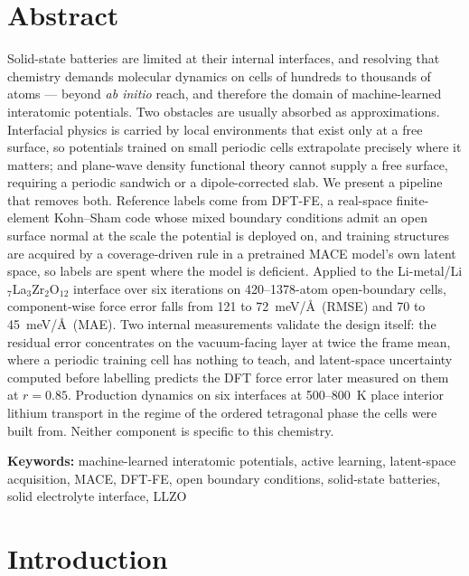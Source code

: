 \documentclass[11pt]{article}
\begin{document}
\section*{Abstract}
Solid-state batteries are limited at their internal interfaces, and resolving
that chemistry demands molecular dynamics on cells of hundreds to thousands of
atoms --- beyond \emph{ab initio} reach, and therefore the domain of
machine-learned interatomic potentials. Two obstacles are usually
absorbed as approximations. Interfacial physics is
carried by local environments that exist only at a free surface, so potentials
trained on small periodic cells extrapolate precisely where it matters; and
plane-wave density functional theory cannot supply a free surface,
requiring a periodic sandwich or a dipole-corrected slab. We present a pipeline
that removes both. Reference labels come from DFT-FE, a real-space
finite-element Kohn--Sham code whose mixed boundary conditions admit an
open surface normal at the scale the potential is deployed on, and
training structures are acquired by a coverage-driven rule in a pretrained MACE
model's own latent space, so labels are spent where the model is deficient. Applied to the Li-metal/Li$_7$La$_3$Zr$_2$O$_{12}$ interface over
six iterations on 420--1378-atom open-boundary cells, component-wise force
error falls from 121 to 72~meV/\AA\ (RMSE) and 70 to 45~meV/\AA\ (MAE). Two
internal measurements validate the design itself: the
residual error concentrates on the vacuum-facing layer at twice the frame
mean, where a periodic training cell has nothing to teach, and
latent-space uncertainty computed before labelling predicts the DFT force
error later measured on them at $r=0.85$. Production
dynamics on six interfaces at 500--800~K place interior lithium transport in
the regime of the ordered tetragonal phase the cells were built from. Neither component is specific to this chemistry.

\vspace{0.5em}
\noindent\textbf{Keywords:} machine-learned interatomic potentials, active
learning, latent-space acquisition, MACE, DFT-FE, open boundary conditions,
solid-state batteries, solid electrolyte interface, LLZO

\section{Introduction}
\end{document}
